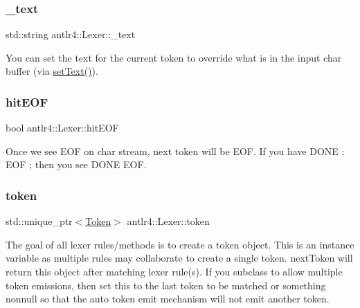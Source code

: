 \subsubsection{\texorpdfstring{\+\_\+text}{\_text}}
{\footnotesize\ttfamily std\+::string antlr4\+::\+Lexer\+::\+\_\+text\hspace{0.3cm}{\ttfamily [protected]}}

You can set the text for the current token to override what is in the input char buffer (via \hyperlink{classantlr4_1_1Lexer_a574e80225f28d8a8005afbe370da9028}{set\+Text()}). \mbox{\label{classantlr4_1_1Lexer_a29874dfe31fab456324eef3af1fa529c}} 
\subsubsection{\texorpdfstring{hit\+E\+OF}{hitEOF}}
{\footnotesize\ttfamily bool antlr4\+::\+Lexer\+::hit\+E\+OF}

Once we see E\+OF on char stream, next token will be E\+OF. If you have D\+O\+NE \+: E\+OF ; then you see D\+O\+NE E\+OF. \mbox{\label{classantlr4_1_1Lexer_aadde3dc45a759a8704d694cfc12fd3f0}} 
\subsubsection{\texorpdfstring{token}{token}}
{\footnotesize\ttfamily std\+::unique\+\_\+ptr$<$\hyperlink{classantlr4_1_1Token}{Token}$>$ antlr4\+::\+Lexer\+::token}

The goal of all lexer rules/methods is to create a token object. This is an instance variable as multiple rules may collaborate to create a single token. next\+Token will return this object after matching lexer rule(s). If you subclass to allow multiple token emissions, then set this to the last token to be matched or something nonnull so that the auto token emit mechanism will not emit another token. \mbox{\label{classantlr4_1_1Lexer_a48b49fec871804e5c18d6c6a68f25b97}} 
